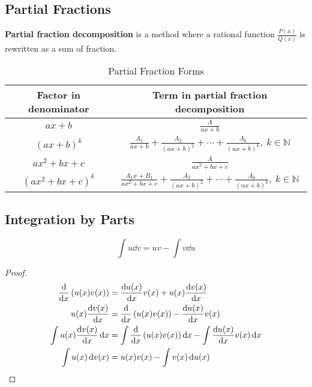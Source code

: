 \documentclass{article}
\begin{document}
\subsection{Partial Fractions}
\begin{definition}
    \textbf{Partial fraction decomposition} is a \linebreak method where a rational function $\frac{P(x)}{Q(x)}$ is rewritten as a sum of fraction.
\end{definition}
\begin{table}[H]
    \renewcommand*{\arraystretch}{1.5}
    \centering
    \begin{tabular}{c | c}
        \toprule
            Factor in denominator & Term in partial fraction decomposition \\
        \midrule
            $ax+b$ & $\frac{A}{ax+b}$ \\
            $\left(ax+b\right)^k$ & $\frac{A_1}{ax+b} + \frac{A_2}{\left( ax+b \right)^2} + \cdots + \frac{A_k}{\left( ax+b \right)^k}, \: k \in \mathbb{N}$ \\
            $ax^2+bx+c$ & $\frac{A}{ax^2+bx+c}$ \\
            $\left(ax^2+bx+c\right)^k$ & $\frac{A_1x+B_1}{ax^2+bx+c} + \frac{A_2}{\left( ax+b \right)^2} + \cdots + \frac{A_k}{\left( ax+b \right)^k}, \: k \in \mathbb{N}$ \\
        \bottomrule
    \end{tabular}
    \caption{Partial Fraction Forms}
\end{table}
\subsection{Integration by Parts}
\begin{theorem}
\begin{equation*}
    \int u \dd{v} = uv - \int v \dd{u}
\end{equation*}
\end{theorem}
\begin{proof}
    \begin{align*}
        \dv{}{x}\left( u(x)v(x) \right) &= \dv{u(x)}{x}v(x) + u(x)\dv{v(x)}{x} \\
        u(x)\dv{v(x)}{x} &= \dv{}{x}\left( u(x)v(x) \right) - \dv{u(x)}{x}v(x) \\
        \int u(x)\dv{v(x)}{x} \dd{x} &= \int \dv{}{x}\left( u(x)v(x) \right) \dd{x} - \int \dv{u(x)}{x}v(x) \dd{x} \\
        \int u(x)\dd{v(x)} &= u(x)v(x) - \int v(x) \dd{u(x)}
    \end{align*}
\end{proof}
\end{document}
